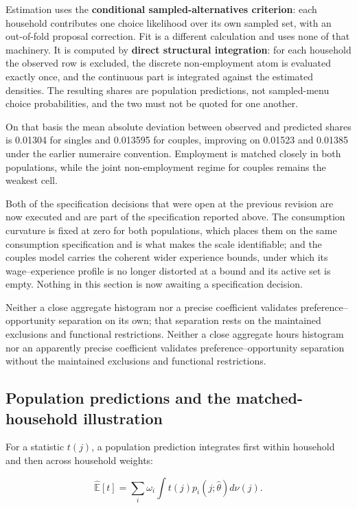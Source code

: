 \documentclass[11pt,a4paper]{article}
\begin{document}
Estimation uses the \textbf{conditional sampled-alternatives criterion}: each household contributes one choice likelihood over its own sampled set, with an out-of-fold proposal correction. Fit is a different calculation and uses none of that machinery. It is computed by \textbf{direct structural integration}: for each household the observed row is excluded, the discrete non-employment atom is evaluated exactly once, and the continuous part is integrated against the estimated densities. The resulting shares are population predictions, not sampled-menu choice probabilities, and the two must not be quoted for one another.

On that basis the mean absolute deviation between observed and predicted shares is 0.01304 for singles and 0.013595 for couples, improving on 0.01523 and 0.01385 under the earlier numeraire convention. Employment is matched closely in both populations, while the joint non-employment regime for couples remains the weakest cell.

Both of the specification decisions that were open at the previous revision are now executed and are part of the specification reported above. The consumption curvature is fixed at zero for both populations, which places them on the same consumption specification and is what makes the scale identifiable; and the couples model carries the coherent wider experience bounds, under which its wage--experience profile is no longer distorted at a bound and its active set is empty. Nothing in this section is now awaiting a specification decision.

Neither a close aggregate histogram nor a precise coefficient validates preference--opportunity separation on its own; that separation rests on the maintained exclusions and functional restrictions. Neither a close aggregate hours histogram nor an apparently precise coefficient validates preference--opportunity separation without the maintained exclusions and functional restrictions.

\subsection{Population predictions and the matched-household illustration}\label{population-predictions-and-the-matched-household-illustration}

For a statistic \(t(j)\), a population prediction integrates first within household and then across household weights:

\[\widehat{\mathbb E}[t]=\sum_i\omega_i\int t(j)p_i(j;\widehat\theta)d\nu(j).\]
\end{document}
